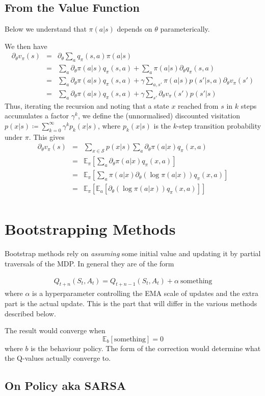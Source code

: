 \documentclass[11pt,a4paper]{article}
\newcommand\be{\begin{equation}}
\newcommand\bea{\begin{eqnarray}}
\newcommand\ee{\end{equation}}
\newcommand\eea{\end{eqnarray}}
\newcommand{\nn}{\nonumber \\}
\newcommand{\e}[2]{\mathbb E_{#2}[#1]}
\begin{document}
\subsection{From the Value Function}


Below we understand that $\pi(a|s)$ depends on $\theta$ parameterically.

We then have
\bea
\partial_\theta v_\pi(s) &=& \partial_\theta \sum_a q_\pi(s,a) \pi(a|s) \nn
&=& \sum_a \partial_\theta \pi(a|s) q_\pi(s,a) + \sum_a \pi(a|s) \partial_\theta q_\pi(s,a) \nn
&=& \sum_a \partial_\theta \pi(a|s) q_\pi(s,a)  + \gamma \sum_{a,s'} \pi(a|s) p(s'|s,a) \partial_\theta v_\pi(s') \nn
&=& \sum_a \partial_\theta \pi(a|s) q_\pi(s,a) + \gamma \sum_{s'} \partial_\theta v_\pi(s') p(s'|s)
\eea
Thus, iterating the recursion and noting that a state $x$ reached from $s$ in $k$ steps accumulates a factor $\gamma^k$, we define the (unnormalised) discounted visitation $p(x|s) \coloneqq \sum_{k=0}^\infty \gamma^k p_k(x|s)$, where $p_k(x|s)$ is the $k$-step transition probability under $\pi$. This gives
\bea
\partial_\theta v_\pi(s) &=& \sum_{x \in \mathcal S} p(x|s) \sum_a \partial_\theta \pi(a| x) q_\pi(x,a) \nn
&=& \mathbb E_\pi \left[  \sum_a \partial_\theta \pi(a| x) q_\pi(x,a) \right] \nn
&=& \mathbb E_\pi \left[ \sum_a \pi(a| x) \partial_\theta \left( \log \pi(a|x) \right)q_\pi(x,a) \right] \nn
&=& \mathbb E_\pi \left[ \mathbb E_a [ \partial_\theta \left( \log \pi(a|x) \right)q_\pi(x,a)]  \right] \nn
\eea


\section{Bootstrapping Methods} \label{sec:bootstrapping_methods}

Bootstrap methods rely on {\em assuming} some initial value and updating it by partial traversals of the MDP.  In general they are of the form

\bea
Q_{t+n}(S_t,A_t) =  Q_{t+n-1} (S_t,A_t) +  \alpha ~ \text{something}
\eea
where $\alpha$ is a hyperparameter controlling the EMA scale of updates and the extra part is the actual update. This is the part that will differ in the various methods described below.

The result would converge when
\be
\e{\text{something}}{b} = 0
\ee
where $b$ is the behaviour policy. The form of the correction would determine what the Q-values actually converge to.



\subsection{On Policy aka  SARSA}
\end{document}
